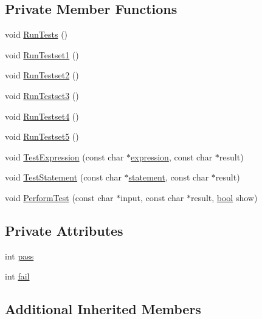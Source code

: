 \subsection*{Private Member Functions}
\begin{DoxyCompactItemize}
\item 
void \hyperlink{classTestProgram_a6b073688b81b9aadb58016516714eb07}{Run\+Tests} ()
\item 
void \hyperlink{classTestProgram_aaaff31d39ac7e8b3976ecdfdc8015493}{Run\+Testset1} ()
\item 
void \hyperlink{classTestProgram_aaa193cada01881a89f4c249d60cdecf1}{Run\+Testset2} ()
\item 
void \hyperlink{classTestProgram_a4863994b99184894450e4a78c3134518}{Run\+Testset3} ()
\item 
void \hyperlink{classTestProgram_a36b246943a769dcc3e1c17b9375b191a}{Run\+Testset4} ()
\item 
void \hyperlink{classTestProgram_a71ed492fc30442d79ce302a3819b0736}{Run\+Testset5} ()
\item 
void \hyperlink{classTestProgram_a5c647a62d7a35026f9b773b3f53452cf}{Test\+Expression} (const char $\ast$\hyperlink{nodes_8h_acac9cbaeea226ed297804c012dc12b16ac810bbb61792a076f46cad2c89d87e1d}{expression}, const char $\ast$result)
\item 
void \hyperlink{classTestProgram_a0bca3db236db9a10530519785bdb7346}{Test\+Statement} (const char $\ast$\hyperlink{nodes_8h_acac9cbaeea226ed297804c012dc12b16a338f0b1773c656a2647feb9e2bf6be09}{statement}, const char $\ast$result)
\item 
void \hyperlink{classTestProgram_a4110ed89e2058a8b31a5d3765d664604}{Perform\+Test} (const char $\ast$input, const char $\ast$result, \hyperlink{platform_8h_a1062901a7428fdd9c7f180f5e01ea056}{bool} show)
\end{DoxyCompactItemize}
\subsection*{Private Attributes}
\begin{DoxyCompactItemize}
\item 
int \hyperlink{classTestProgram_a5856de2640ac888878a1d5c732c25e53}{pass}
\item 
int \hyperlink{classTestProgram_a3ba8ef801d7fe3025b0f14eb9d8593fa}{fail}
\end{DoxyCompactItemize}
\subsection*{Additional Inherited Members}


